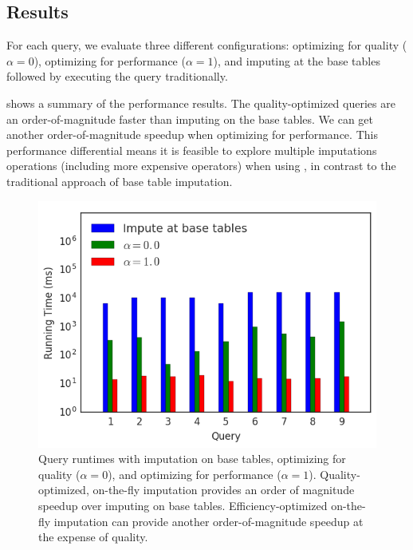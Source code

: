 \begin{table}
  \centering
  
\end{table}

%  

\subsection{Results}\label{sec:results}

For each query, we evaluate three different configurations: \ProjectName{} optimizing for
quality ($\alpha=0$), \ProjectName{} optimizing for performance ($\alpha=1$), and imputing
at the base tables followed by executing the query traditionally. 

 shows a summary of the performance results. The quality-optimized
queries are an order-of-magnitude faster than imputing on the base tables. We can get
another order-of-magnitude speedup when optimizing for performance. This performance
differential means it is feasible
to explore multiple imputations operations (including more expensive operators) when using
\ProjectName{}, in contrast to the traditional approach of base table imputation.

\begin{figure}
\includegraphics[width=\columnwidth]{figures/running_times_combined_bar.png}
\caption{Query runtimes with imputation on base tables, \ProjectName{}
    optimizing for quality ($\alpha=0$), and \ProjectName{} optimizing for
    performance ($\alpha=1$). Quality-optimized, on-the-fly imputation provides an order of
    magnitude speedup over imputing on base tables. Efficiency-optimized on-the-fly
    imputation can provide another order-of-magnitude speedup at the expense of quality.}
    
\label{fig:runtimes}
\end{figure}

